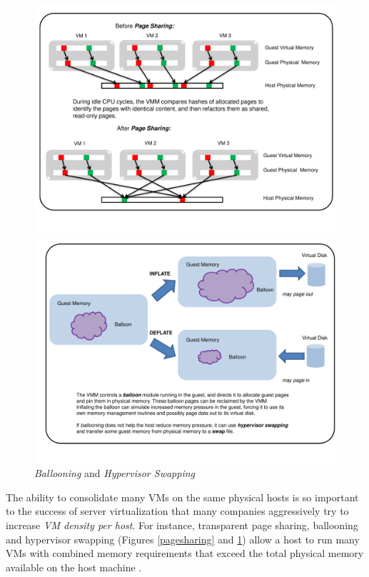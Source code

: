 \begin{figure}[p]
  \centering
  \includegraphics[scale=0.55, trim=1cm 0cm 2cm 0cm]{pagesharing.pdf}  
  \caption[{\em Transparent Page Sharing}]%
          {{\em Transparent Page Sharing}}
          \label{pagesharing}
  \includegraphics[scale=0.58, trim=1cm 0cm 1cm 0cm]{balloon.pdf}   
  \caption[{\em Ballooning} and {\em Hypervisor Swapping}]%
          {{\em Ballooning} and {\em Hypervisor Swapping}}
          \label{balloon}
\end{figure}


The ability to consolidate many VMs
on the same physical hosts is so important to the success
of server virtualization that many companies 
aggressively try to increase {\em VM density per host}.
For instance, transparent page sharing, ballooning
and hypervisor swapping (Figures \ref{pagesharing} and \ref{balloon})
allow a host to run many VMs with
combined memory requirements
that exceed the total physical memory
available on the host machine \cite{waldspurger2002memory}.

